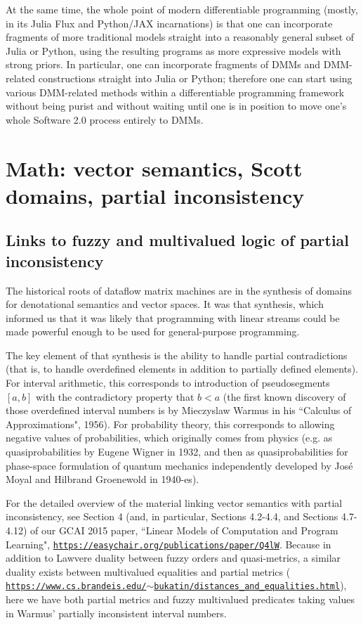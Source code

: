 \documentclass{article}
\begin{document}
At the same time, the whole point of modern differentiable programming (mostly, in its Julia Flux and Python/JAX
incarnations) is that one can incorporate fragments of more traditional models straight into a reasonably general subset of
Julia or Python, using the resulting programs as more expressive models with strong priors. In particular, one can incorporate fragments of DMMs and DMM-related constructions straight into
Julia or Python; therefore one can start using various DMM-related methods within a differentiable programming
framework without being purist and without
waiting until one is in position to move one's whole Software 2.0 process entirely to DMMs. 

\section{Math: vector semantics, Scott domains, partial inconsistency}

\subsection{Links to fuzzy and multivalued logic of
partial inconsistency}

The historical roots of dataflow matrix machines are in the synthesis of domains
for denotational semantics and vector spaces. It was that synthesis, which informed us that it was likely
that programming with linear streams could be made powerful enough to be used for general-purpose programming.

The key element of that synthesis is the ability to handle partial contradictions (that is, to handle
overdefined elements in addition to partially defined elements). For interval arithmetic,  
this corresponds to introduction of pseudosegments $[a, b]$ with the contradictory property that
$b < a$ (the first known discovery of those overdefined interval numbers is by Mieczyslaw Warmus in his ``Calculus of Approximations", 1956). For probability theory, this corresponds to allowing negative values of probabilities,
which originally comes from physics (e.g. as quasiprobabilities by Eugene Wigner in 1932, and then as quasiprobabilities for phase-space formulation
of quantum mechanics independently developed by Jos\'e Moyal and Hilbrand Groenewold in 1940-es).

For the detailed overview of the material linking vector semantics with partial inconsistency, see Section 4 (and, in particular, Sections 4.2-4.4, and Sections 4.7-4.12) of our GCAI 2015 paper, ``Linear Models of Computation and Program Learning", \href{https://easychair.org/publications/paper/Q4lW}{\tt https://easychair.org/publications/paper/Q4lW}. Because in addition to Lawvere duality between fuzzy orders and quasi-metrics, a similar duality exists between multivalued equalities and partial metrics ( \href{https://www.cs.brandeis.edu/~bukatin/distances_and_equalities.html}{\tt https://www.cs.brandeis.edu/$\sim$bukatin/distances\_and\_equalities.html}), here we have both partial metrics and fuzzy multivalued predicates taking values in Warmus' partially inconsistent interval numbers.
\end{document}
